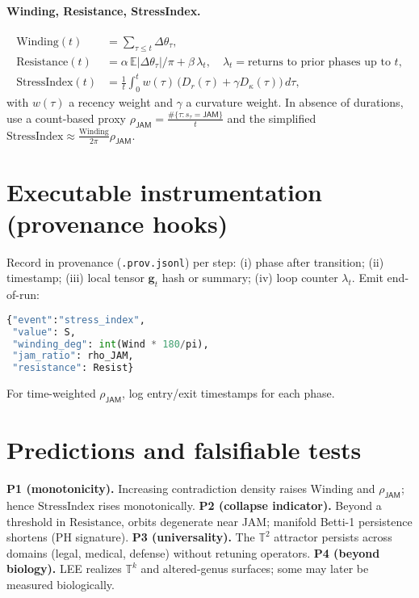 \documentclass[11pt]{article}
\newcommand{\Jam}{\textsf{JAM}}
\newcommand{\T}{\mathbb{T}}
\newcommand{\Stress}{\mathrm{StressIndex}}
\newcommand{\Resist}{\mathrm{Resistance}}
\newcommand{\Wind}{\mathrm{Winding}}
\begin{document}
\paragraph{Winding, Resistance, StressIndex.}
\begin{align}
\Wind(t) &= \sum_{\tau\le t}\Delta\theta_\tau,\\
\Resist(t) &= \alpha\,\mathbb{E}|\Delta\theta_\tau|/\pi + \beta\,\lambda_t,\quad \lambda_t=\text{returns to prior phases up to }t,\\
\Stress(t) &= \frac{1}{t}\int_0^t w(\tau)\, \Big(D_r(\tau)+\gamma D_\kappa(\tau)\Big)\,d\tau,
\end{align}
with $w(\tau)$ a recency weight and $\gamma$ a curvature weight.
In absence of durations, use a count-based proxy $\rho_{\Jam}=\frac{\#\{\tau: s_\tau=\Jam\}}{t}$ and the simplified $ \Stress \approx \frac{\Wind}{2\pi}\rho_{\Jam}$.

\section{Executable instrumentation (provenance hooks)}
Record in provenance (\texttt{.prov.jsonl}) per step:
(i) phase after transition; (ii) timestamp; (iii) local tensor $\bm{g}_t$ hash or summary; (iv) loop counter $\lambda_t$. Emit end-of-run:
\begin{lstlisting}[language=Python,basicstyle=\ttfamily\small]
{"event":"stress_index",
 "value": S,
 "winding_deg": int(Wind * 180/pi),
 "jam_ratio": rho_JAM,
 "resistance": Resist}
\end{lstlisting}
For time-weighted $\rho_{\Jam}$, log entry/exit timestamps for each phase.

\section{Predictions and falsifiable tests}
\textbf{P1 (monotonicity).} Increasing contradiction density raises $\Wind$ and $\rho_{\Jam}$; hence $\Stress$ rises monotonically.\newline
\textbf{P2 (collapse indicator).} Beyond a threshold in $\Resist$, orbits degenerate near \Jam; manifold Betti-1 persistence shortens (PH signature).\newline
\textbf{P3 (universality).} The $\T^2$ attractor persists across domains (legal, medical, defense) without retuning operators.\newline
\textbf{P4 (beyond biology).} LEE realizes $\T^k$ and altered-genus surfaces; some may later be measured biologically.
\end{document}
